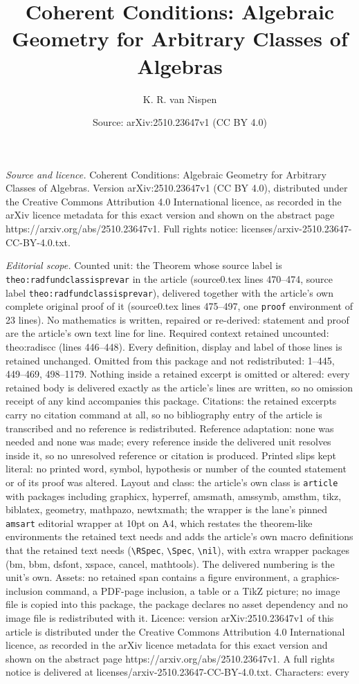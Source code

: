 \documentclass[10pt,a4paper]{amsart}
\title[Coherent Conditions: Algebraic Geometry for Arbitrary Classe]{Coherent Conditions: Algebraic Geometry for Arbitrary Classes of Algebras}
\author{K. R. van Nispen}
\date{Source: arXiv:2510.23647v1 (CC BY 4.0)}
\begin{document}
\maketitle

\noindent\emph{Source and licence.} Coherent Conditions: Algebraic Geometry for Arbitrary Classes of Algebras. Version arXiv:2510.23647v1 (CC BY 4.0), distributed under the Creative Commons Attribution 4.0 International licence, as recorded in the arXiv licence metadata for this exact version and shown on the abstract page https://arxiv.org/abs/2510.23647v1. Full rights notice: licenses/arxiv-2510.23647-CC-BY-4.0.txt.\par\smallskip

\noindent\textit{Editorial scope.} Counted unit: the Theorem whose source label is \texttt{theo:radfundclassisprevar} in the article (source0.tex lines 470--474, source label \texttt{theo:radfundclassisprevar}), delivered together with the article's own complete original proof of it (source0.tex lines 475--497, one \texttt{proof} environment of 23 lines). No mathematics is written, repaired or re-derived: statement and proof are the article's own text line for line. Required context retained uncounted: theo:radiscc (lines 446--448). Every definition, display and label of those lines is retained unchanged. Omitted from this package and not redistributed: 1--445, 449--469, 498--1179. Nothing inside a retained excerpt is omitted or altered: every retained body is delivered exactly as the article's lines are written, so no omission receipt of any kind accompanies this package. Citations: the retained excerpts carry no citation command at all, so no bibliography entry of the article is transcribed and no reference is redistributed. Reference adaptation: none was needed and none was made; every reference inside the delivered unit resolves inside it, so no unresolved reference or citation is produced. Printed slips kept literal: no printed word, symbol, hypothesis or number of the counted statement or of its proof was altered. Layout and class: the article's own class is \texttt{article} with packages including graphicx, hyperref, amsmath, amssymb, amsthm, tikz, biblatex, geometry, mathpazo, newtxmath; the wrapper is the lane's pinned \texttt{amsart} editorial wrapper at 10pt on A4, which restates the theorem-like environments the retained text needs and adds the article's own macro definitions that the retained text needs (\texttt{\textbackslash RSpec}, \texttt{\textbackslash Spec}, \texttt{\textbackslash nil}), with extra wrapper packages (bm, bbm, dsfont, xspace, cancel, mathtools). The delivered numbering is the unit's own. Assets: no retained span contains a figure environment, a graphics-inclusion command, a PDF-page inclusion, a table or a TikZ picture; no image file is copied into this package, the package declares no asset dependency and no image file is redistributed with it. Licence: version arXiv:2510.23647v1 of this article is distributed under the Creative Commons Attribution 4.0 International licence, as recorded in the arXiv licence metadata for this exact version and shown on the abstract page https://arxiv.org/abs/2510.23647v1. A full rights notice is delivered at licenses/arxiv-2510.23647-CC-BY-4.0.txt. Characters: every 
\end{document}
